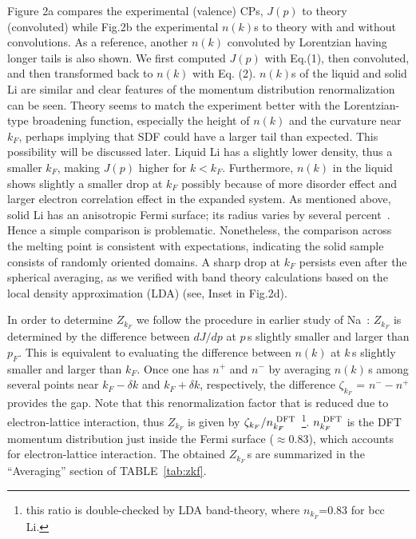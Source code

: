 \documentclass[twocolumn,showpacs,showkeys,fleqn,prl,superscriptaddress]{revtex4}%
\newcommand{\nn}[1]{\textnormal{ #1}}
\begin{document}
Figure 2a compares the experimental (valence) CPs, $J(p)$ to theory (convoluted) while Fig.2b the experimental $n(k)$s to theory with and without convolutions.
As a reference, another $n(k)$ convoluted by Lorentzian having longer tails is also shown.
We first computed  $J(p)$ with Eq.(1), then convoluted, and then transformed back to $n(k)$ with Eq. (2).
$n(k)$s of the liquid and solid Li are similar and clear features of the momentum distribution renormalization can be seen.
Theory seems to match the experiment better with the Lorentzian-type broadening function, especially the height of $n(k)$ and the curvature near $k_F$, perhaps implying that SDF could have a larger tail than expected.
This possibility will be discussed later.
Liquid Li has a slightly lower density, thus a smaller $k_F$, making $J(p)$ higher for $k < k_F$.
Furthermore, $n(k)$ in the liquid shows slightly a smaller drop at $ k_F $  possibly because of more disorder effect and  larger electron correlation effect in the expanded system.
As mentioned above, solid Li has an anisotropic Fermi surface; its radius varies by several percent~\cite{saku95,schulke96}. Hence a simple comparison is problematic.
Nonetheless, the comparison across the melting point is consistent with expectations, indicating the solid sample consists of randomly oriented domains.
A sharp drop at $k_F$ persists even after the spherical averaging, as we verified with band theory  calculations based on the local density approximation (LDA) (see, Inset in Fig.2d).

In order to determine $Z_{k_F}$ we follow the procedure in earlier study of Na~\cite{simo10}: $Z_{k_F}$ is determined by the difference between $dJ/dp$ at $p\,$s slightly smaller and larger than $p_F$.
This is equivalent to evaluating the difference between $n(k)$ at $k\,$s slightly smaller and larger than $k_F$.
Once one has $n^+$ and $n^-$ by averaging $n(k)$\,s among several points near $k_F-\delta k$ and  $k_F+\delta k$, respectively, the difference $\zeta_{k_F}$ = $n^- - n^+$ provides the gap.
Note that this renormalization factor that is reduced due to electron-lattice interaction, thus
$Z_{k_F}$ is given by $\zeta_{k_F}/n_{k_F}^{\nn{DFT}}$~\footnote{this ratio is double-checked by LDA band-theory, where $n_{k_F}$=0.83 for bcc Li.}.
$n_{k_F}^{\nn{DFT}}$ is the DFT momentum distribution just inside the Fermi surface ($\approx$0.83), which accounts for electron-lattice interaction.
The obtained $Z_{k_F}\,$s are summarized in the ``Averaging'' section of TABLE~\ref{tab:zkf}.
\end{document}
